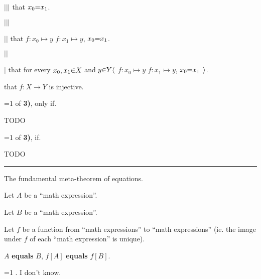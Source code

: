       $|$\hs$|$\hs$|$\hs {} that $x_0 \p= x_1$. \par
      $|$\hs$|$\hs$|$\hs \par

    $|$\hs$|$\hs {} that  $f: x_0 \mapsto y$  $f: x_1 \mapsto y$,  $x_0 \p= x_1$. \par
    $|$\hs$|$\hs \par

  $|$\hs {} that for every $x_0,x_1 \p\in X$ and $y \p\in Y \a\langle$  $f: x_0 \mapsto y$  $f: x_1 \mapsto y$,  $x_0 \p= x_1$ $\a\rangle$. \par

\vs
{} that $f: X \to Y$ is injective. \par
\fi

=1
\vs
{} of {\bf 3)}, only if. \par
TODO
\fi

=1
\vs
{} of {\bf 3)}, if. \par
TODO
\fi


\vs\hrule\vskip1pt
\theorem The fundamental meta-theorem of equations. \par
Let $A$ be a ``math expression''. \par
Let $B$ be a ``math expression''. \par
Let $f$ be a function from ``math expressions'' to ``math expressions'' (ie. the image under $f$ of each ``math expression'' is unique). \par
    $A$ {\bf equals} $B$,  $f[A]$ {\bf equals} $f[B]$. \par

=1
. I don't know.
\fi




